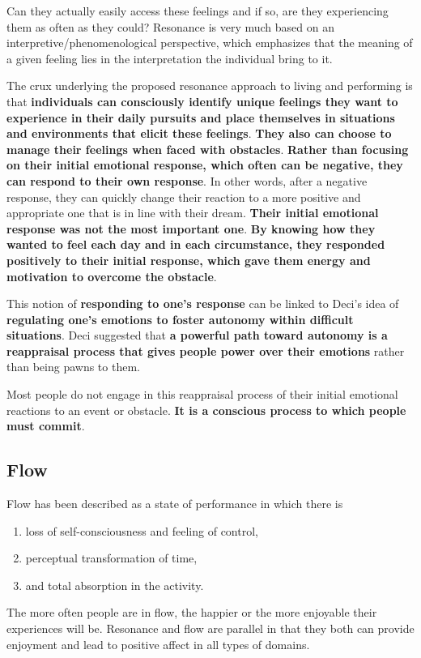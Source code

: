 \documentclass[ebook,12pt,oneside,openany]{memoir}
\begin{document}
Can they actually easily access these feelings and if so, are they experiencing them as often as they could?
Resonance is very much based on an interpretive/phenomenological perspective, which emphasizes that the meaning of a given feeling lies in the interpretation the individual bring to it.

The crux underlying the proposed resonance approach to living and performing is that \textbf{individuals can consciously identify unique feelings they want to experience in their daily pursuits
and place themselves in situations and environments that elicit these feelings}.
\textbf{They also can choose to manage their feelings when faced with obstacles}.
\textbf{Rather than focusing on their initial emotional response, which often can be negative, they can respond to their own response}.
In other words, after a negative response, they can quickly change their reaction to a more positive and appropriate one that is in line with their dream.
\textbf{Their initial emotional response was not the most important one}. 
\textbf{By knowing how they wanted to feel each day and in each circumstance, they responded positively to their initial response, which gave them energy and motivation to overcome the obstacle}.

This notion of \textbf{responding to one's response} can be linked to Deci's idea of \textbf{regulating one's emotions to foster autonomy within difficult situations}.
Deci suggested that \textbf{a powerful path toward autonomy is a reappraisal process that gives people power over their emotions} rather than being pawns to them.

Most people do not engage in this reappraisal process of their initial emotional reactions to an event or obstacle.
\textbf{It is a conscious process to which people must commit}.

\subsection{Flow}
Flow has been described as a state of performance in which there is 
\begin{enumerate}
    \item loss of self-consciousness and feeling of control,
    \item perceptual transformation of time,
    \item and total absorption in the activity.
\end{enumerate}

The more often people are in flow, the happier or the more enjoyable their experiences will be.
Resonance and flow are parallel in that they both can provide enjoyment and lead to positive affect in all types of domains.
\end{document}
